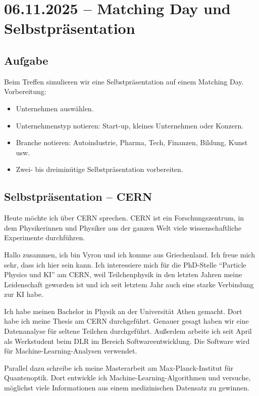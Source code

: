 \section{06.11.2025 -- Matching Day und Selbstpräsentation}

\subsection{Aufgabe}

Beim Treffen simulieren wir eine Selbstpräsentation auf einem Matching Day. Vorbereitung:
\begin{itemize}
    \item Unternehmen auswählen.
    \item Unternehmenstyp notieren: Start-up, kleines Unternehmen oder Konzern.
    \item Branche notieren: Autoindustrie, Pharma, Tech, Finanzen, Bildung, Kunst usw.
    \item Zwei- bis dreiminütige Selbstpräsentation vorbereiten.
\end{itemize}

\subsection{Selbstpräsentation -- CERN}

Heute möchte ich über CERN sprechen. CERN ist ein Forschungszentrum, in dem Physikerinnen und Physiker aus der ganzen Welt viele wissenschaftliche Experimente durchführen.

Hallo zusammen, ich bin Vyron und ich komme aus Griechenland. Ich freue mich sehr, dass ich hier sein kann. Ich interessiere mich für die PhD-Stelle ``Particle Physics und KI'' am CERN, weil Teilchenphysik in den letzten Jahren meine Leidenschaft geworden ist und ich seit letztem Jahr auch eine starke Verbindung zur KI habe.

Ich habe meinen Bachelor in Physik an der Universität Athen gemacht. Dort habe ich meine Thesis am CERN durchgeführt. Genauer gesagt haben wir eine Datenanalyse für seltene Teilchen durchgeführt. Außerdem arbeite ich seit April als Werkstudent beim DLR im Bereich Softwareentwicklung. Die Software wird für Machine-Learning-Analysen verwendet.

Parallel dazu schreibe ich meine Masterarbeit am Max-Planck-Institut für Quantenoptik. Dort entwickle ich Machine-Learning-Algorithmen und versuche, möglichst viele Informationen aus einem medizinischen Datensatz zu gewinnen.

